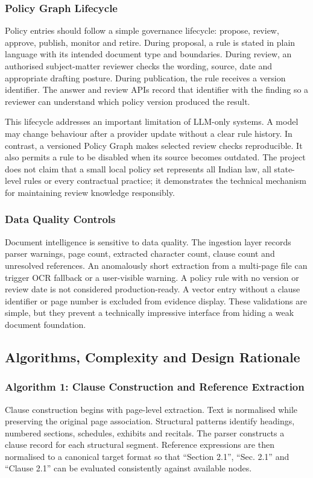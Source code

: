 \documentclass[12pt,a4paper,oneside]{report}
\begin{document}
\subsubsection{Policy Graph Lifecycle}
Policy entries should follow a simple governance lifecycle: propose, review, approve, publish, monitor and retire. During proposal, a rule is stated in plain language with its intended document type and boundaries. During review, an authorised subject-matter reviewer checks the wording, source, date and appropriate drafting posture. During publication, the rule receives a version identifier. The answer and review APIs record that identifier with the finding so a reviewer can understand which policy version produced the result.

This lifecycle addresses an important limitation of LLM-only systems. A model may change behaviour after a provider update without a clear rule history. In contrast, a versioned Policy Graph makes selected review checks reproducible. It also permits a rule to be disabled when its source becomes outdated. The project does not claim that a small local policy set represents all Indian law, all state-level rules or every contractual practice; it demonstrates the technical mechanism for maintaining review knowledge responsibly.

\subsubsection{Data Quality Controls}
Document intelligence is sensitive to data quality. The ingestion layer records parser warnings, page count, extracted character count, clause count and unresolved references. An anomalously short extraction from a multi-page file can trigger OCR fallback or a user-visible warning. A policy rule with no version or review date is not considered production-ready. A vector entry without a clause identifier or page number is excluded from evidence display. These validations are simple, but they prevent a technically impressive interface from hiding a weak document foundation.


\subsection{Algorithms, Complexity and Design Rationale}

\subsubsection{Algorithm 1: Clause Construction and Reference Extraction}
Clause construction begins with page-level extraction. Text is normalised while preserving the original page association. Structural patterns identify headings, numbered sections, schedules, exhibits and recitals. The parser constructs a clause record for each structural segment. Reference expressions are then normalised to a canonical target format so that ``Section 2.1'', ``Sec. 2.1'' and ``Clause 2.1'' can be evaluated consistently against available nodes.
\end{document}
